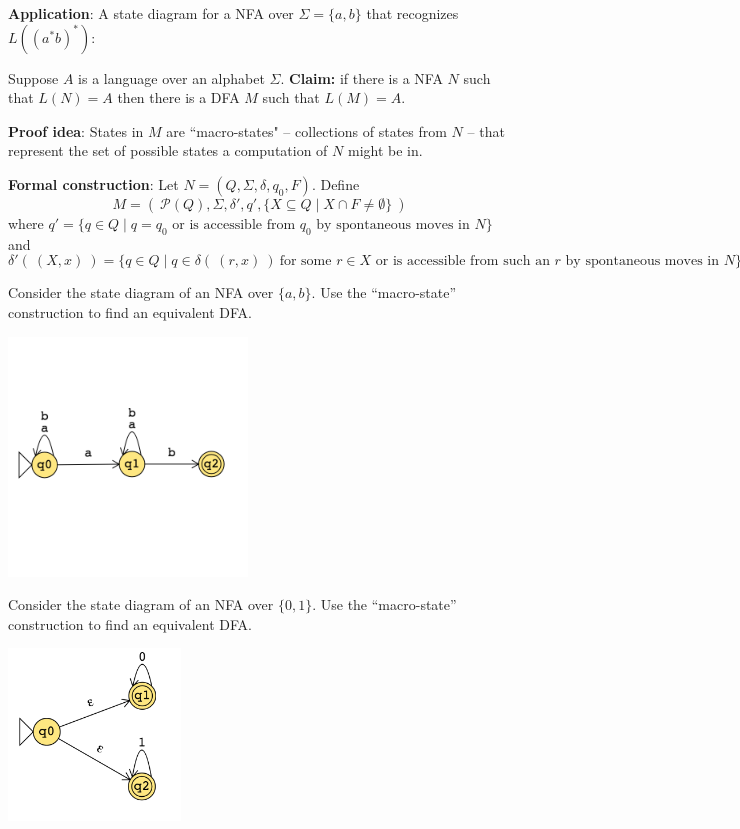 \documentclass[12pt, oneside]{article}
\begin{document}
{\bf Application}: A state diagram for a NFA over $\Sigma = \{a,b\}$ 
that recognizes $L (( a^*b)^* )$:

\vfill
\newpage
Suppose $A$ is a language over an alphabet $\Sigma$.
{\bf Claim:} if there is a NFA $N$ such that $L(N) = A$ then 
there is a DFA $M$ such that $L(M) = A$.

{\bf Proof idea}: States in $M$ are ``macro-states" -- collections of states from $N$ -- 
that represent the set of possible states a computation of $N$ might be in.


{\bf Formal construction}: Let $N = (Q, \Sigma, \delta, q_0, F)$.  Define 
\[
M = (~ \mathcal{P}(Q), \Sigma, \delta', q',  \{ X \subseteq Q \mid X \cap F \neq \emptyset \}~ )
\]
where $q' = \{ q \in Q \mid \text{$q = q_0$ or is accessible from $q_0$ by spontaneous moves in $N$} \}$
and 
\[
    \delta' (~(X, x)~) = \{ q \in Q \mid q \in \delta( ~(r,x)~) ~\text{for some $r \in X$ or is accessible 
from such an $r$ by spontaneous moves in $N$} \}
\]


Consider the state diagram of an NFA over $\{a,b\}$. Use the ``macro-state'' construction 
to find an equivalent DFA.

\includegraphics[width=2.5in]{../../resources/machines/Lect6NFA1.png}




\vfill

Consider the state diagram of an NFA over $\{0,1\}$. Use the ``macro-state'' construction 
to find an equivalent DFA.


\includegraphics[width=1.8in]{../../resources/machines/Lect6NFA2.png}
\end{document}
